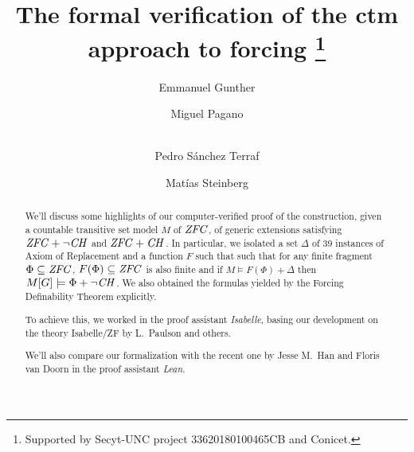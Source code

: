 \documentclass[runningheads]{llncs}
\begin{document}
%
\title{The formal verification of the ctm approach to forcing%
  \thanks{Supported by Secyt-UNC project 33620180100465CB and Conicet.}%
}
%
%
\author{Emmanuel Gunther \and
Miguel Pagano \and \\
Pedro Sánchez Terraf%
\and
Matías Steinberg
}
%
%
%
\maketitle              %
%
\begin{abstract}
  We'll discuss some highlights of our computer-verified
  proof of the construction, given a countable transitive set model $M$
  of $\mathit{ZFC}$, of generic extensions  satisfying $\mathit{ZFC}+\neg\mathit{CH}$ and $\mathit{ZFC}+\mathit{CH}$.
  In particular,
  we isolated a set $\Delta$ of 39 instances
  of Axiom of Replacement and a function $F$
  such that such that for any finite fragment $\Phi\subseteq\mathit{ZFC}$,
  $F(\Phi)\subseteq\mathit{ZFC}$ is also finite and if
  $M\models F(\Phi) + \Delta$ then $M[G]\models \Phi + \neg \mathit{CH}$.
  We also obtained the formulas yielded by the Forcing Definability Theorem
  explicitly.

  To achieve this, we worked in the proof assistant \emph{Isabelle},
  basing our development on the theory Isabelle/ZF by L.~Paulson and
  others.


  We'll also compare our formalization with the recent one by Jesse
  M.~Han and Floris van Doorn in the proof assistant \emph{Lean}.

\end{abstract}
%
%
%

 
\end{document}
